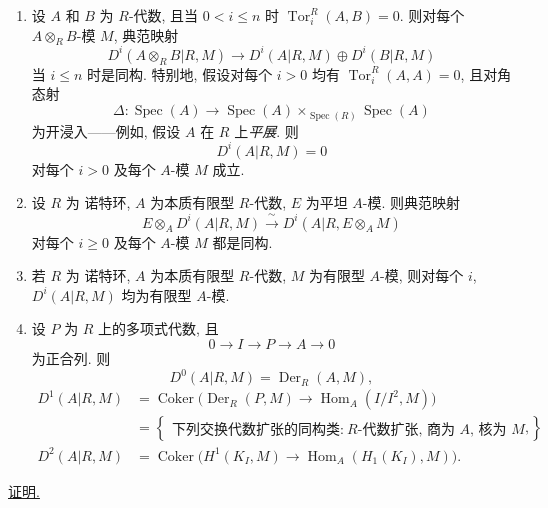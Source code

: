 \begin{enumerate}[label=(\arabic*)]
\item 设 $A$ 和 $B$ 为 $R$-代数, 且当 $0<i\leq n$ 时 $\operatorname{Tor}_i^R(A,B)=0$. 则对每个 $A\otimes_RB$-模 $M$, 典范映射
\[
 D^i(A\otimes_RB|R,M)
 \longrightarrow D^i(A|R,M)\oplus D^i(B|R,M)
\]
当 $i\leq n$ 时是同构. 特别地, 假设对每个 $i>0$ 均有 $\operatorname{Tor}_i^R(A,A)=0$, 且对角态射
\[
 \Delta:\operatorname{Spec}(A)\longrightarrow
 \operatorname{Spec}(A)\times_{\operatorname{Spec}(R)}
 \operatorname{Spec}(A)
\]
为开浸入——例如, 假设 $A$ 在 $R$ 上\emph{平展}. 则
\[
 D^i(A|R,M)=0
\]
对每个 $i>0$ 及每个 $A$-模 $M$ 成立.


\item 设 $R$ 为 诺特环, $A$ 为本质有限型 $R$-代数, $E$ 为平坦 $A$-模. 则典范映射
\[
 E\otimes_AD^i(A|R,M)
 \xrightarrow{\ \sim\ }
 D^i(A|R,E\otimes_AM)
\]
对每个 $i\geq0$ 及每个 $A$-模 $M$ 都是同构.

\item 若 $R$ 为 诺特环, $A$ 为本质有限型 $R$-代数, $M$ 为有限型 $A$-模, 则对每个 $i$, $D^i(A|R,M)$ 均为有限型 $A$-模.

\item 设 $P$ 为 $R$ 上的多项式代数, 且
\[
 0\longrightarrow I\longrightarrow P\longrightarrow A
 \longrightarrow0
\]
为正合列. 则
\[
 D^0(A|R,M)=\operatorname{Der}_R(A,M),
\]
\begin{align*}
D^1(A|R,M)
 &=\operatorname{Coker}\bigl(
   \operatorname{Der}_R(P,M)\longrightarrow
   \operatorname{Hom}_A(I/I^2,M)\bigr)\\
 &=\left\{
   \begin{array}{c}
   \text{下列交换代数扩张的同构类:}\
   R\text{-代数扩张, 商为 }A\text{, 核为 }M
   \end{array}\right\},\\
D^2(A|R,M)
 &=\operatorname{Coker}\bigl(
   H^1(K_I,M)\longrightarrow
   \operatorname{Hom}_A(H_1(K_I),M)\bigr).
\end{align*}
\end{enumerate}


\underline{证明.}


